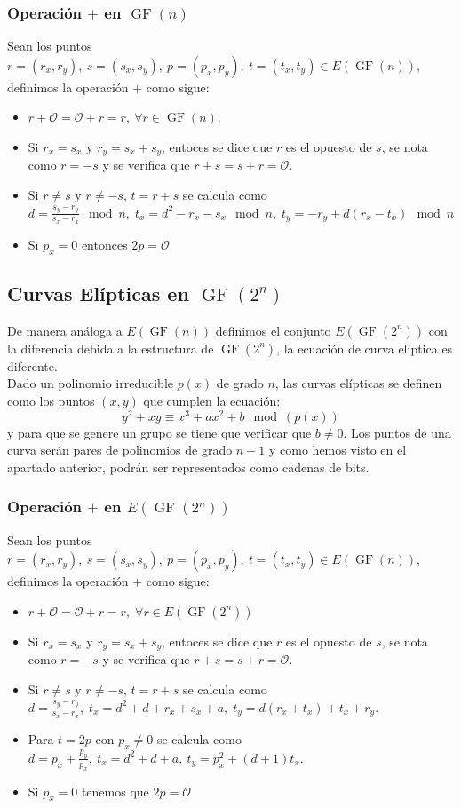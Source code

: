 \begin{aligned*}
\subsubsection{Operación $+$ en $\operatorname{GF}(n)$}
Sean los puntos $r=(r_x,r_y),\: s=(s_x,s_y),\: p=(p_x,p_y),\: t=(t_x,t_y)\in E(\operatorname{GF}(n))$, definimos la operación $+$  como sigue:
\begin{itemize}
	\item $r+\mathcal{O}=\mathcal{O}+r=r,\: \forall r \in \operatorname{GF}(n)$.
	\item Si $r_x=s_x$ y $r_y=s_x+s_y$, entoces se dice que $r$ es el opuesto de $s$, se nota como $r=-s$ y se verifica que $r+s=s+r=\mathcal{O}$.
	\item Si $r\neq s$ y $r\neq-s$, $t=r+s$ se calcula como $d=\frac{s_y-r_y}{s_x-r_x}\mod n,\; t_x=d^2-r_x-s_x \mod n,\; t_y=-r_y+d(r_x-t_x) \mod n$
	\item Si $p_x = 0$ entonces $2p = \mathcal{O}$
\end{itemize}

\subsection{Curvas Elípticas en $\operatorname{GF}(2^n)$}

De manera análoga a $E(\operatorname{GF}(n))$ definimos el conjunto $E(\operatorname{GF}(2^n))$ con la diferencia debida a la estructura de $\operatorname{GF}(2^n)$, la ecuación de curva elíptica es diferente.\\
Dado un polinomio irreducible $p(x)$ de grado $n$, las curvas elípticas se definen como los puntos $(x,y)$ que cumplen la ecuación:
$$
	y^2+xy \equiv x^3+ax^2+b \mod (p(x))
$$
y para que se genere un grupo se tiene que verificar que $b\neq 0$.
Los puntos de una curva serán pares de polinomios de grado $n-1$ y como hemos visto en el apartado anterior, podrán ser representados como cadenas de bits.\\

\subsubsection{Operación $+$ en $E(\operatorname{GF}(2^n))$}
Sean los puntos $r=(r_x,r_y),\: s=(s_x,s_y),\: p=(p_x,p_y),\: t=(t_x,t_y)\in E(\operatorname{GF}(n))$, definimos la operación $+$  como sigue:
\begin{itemize}
	\item $r+\mathcal{O}=\mathcal{O}+r=r,\; \forall r \in E(\operatorname{GF}(2^n))$
	\item Si $r_x=s_x$ y $r_y=s_x+s_y$, entoces se dice que $r$ es el opuesto de $s$, se nota como $r=-s$ y se verifica que $r+s=s+r=\mathcal{O}$.
	\item Si $r\neq s$ y $r\neq-s$, $t=r+s$ se calcula como $d=\frac{s_y-r_y}{s_x-r_x},\; t_x=d^2+d+r_x+s_x+a,\; t_y=d(r_x+t_x)+t_x+r_y$.
	\item Para $t=2p$ con $p_x\neq 0$ se calcula como $d=p_x+\frac{p_y}{p_x}, \: t_x=d^2+d+a, \: t_y=p_x^2+(d+1)t_x$.
	\item Si $p_x=0$ tenemos que $2p=\mathcal{O}$
\end{itemize}


\end{aligned*}
